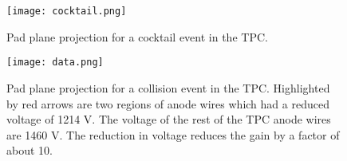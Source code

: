 \begin{figure}[ht!]
\texttt{[image: cocktail.png]}
\caption{Pad plane projection for a cocktail event in the TPC.}
\label{fig:cocktail}
\end{figure}

\begin{figure}[ht!]
\texttt{[image: data.png]}
\caption{Pad plane projection for a collision event in the TPC. Highlighted by red arrows are two regions of anode wires which had a reduced voltage of 1214 V. The voltage of the rest of the TPC anode wires are 1460 V. The reduction in voltage reduces the gain by a factor of about 10. }
\label{fig:data}
\end{figure}
